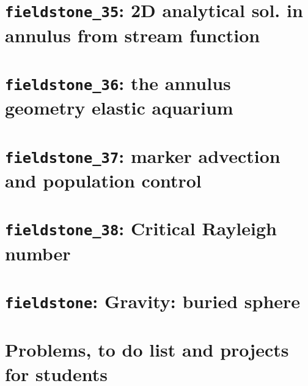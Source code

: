 \documentclass[a4paper]{article}
\begin{document}
\newpage %
\section{{\tt fieldstone\_35}: 2D analytical sol. in annulus from stream function \label{f35}}

\newpage %
\section{{\tt fieldstone\_36}: the annulus geometry elastic aquarium \label{f36}}%

\newpage %
\section{{\tt fieldstone\_37}: marker advection and population control \label{f37}} %

\newpage %
\section{{\tt fieldstone\_38}: Critical Rayleigh number \label{f38}} %

\newpage %
\section{{\tt fieldstone}: Gravity: buried sphere} %

\newpage %
\section{Problems, to do list and projects for students} %
\end{document}
